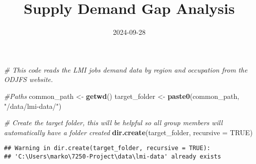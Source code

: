 \documentclass[
]{article}
\title{Supply Demand Gap Analysis}
\author{}
\date{\vspace{-2.5em}2024-09-28}
\newenvironment{Shaded}{\begin{snugshade}}{\end{snugshade}}
\newcommand{\AttributeTok}[1]{\textcolor[rgb]{0.13,0.29,0.53}{#1}}
\newcommand{\CommentTok}[1]{\textcolor[rgb]{0.56,0.35,0.01}{\textit{#1}}}
\newcommand{\ConstantTok}[1]{\textcolor[rgb]{0.56,0.35,0.01}{#1}}
\newcommand{\FunctionTok}[1]{\textcolor[rgb]{0.13,0.29,0.53}{\textbf{#1}}}
\newcommand{\NormalTok}[1]{#1}
\newcommand{\OtherTok}[1]{\textcolor[rgb]{0.56,0.35,0.01}{#1}}
\newcommand{\StringTok}[1]{\textcolor[rgb]{0.31,0.60,0.02}{#1}}
\begin{document}
\maketitle

\begin{Shaded}
\begin{Highlighting}[]
\CommentTok{\# This code reads the LMI jobs demand data by region and occupation from the ODJFS website. }

\CommentTok{\#Paths}
\NormalTok{common\_path }\OtherTok{\textless{}{-}} \FunctionTok{getwd}\NormalTok{()}
\NormalTok{target\_folder }\OtherTok{\textless{}{-}} \FunctionTok{paste0}\NormalTok{(common\_path, }\StringTok{"/data/lmi{-}data/"}\NormalTok{)}

\CommentTok{\# Create the target folder, this will be helpful so all group members will automatically have a folder created}
  \FunctionTok{dir.create}\NormalTok{(target\_folder, }\AttributeTok{recursive =} \ConstantTok{TRUE}\NormalTok{)}
\end{Highlighting}
\end{Shaded}

\begin{verbatim}
## Warning in dir.create(target_folder, recursive = TRUE):
## 'C:\Users\marko\7250-Project\data\lmi-data' already exists
\end{verbatim}
\end{document}
